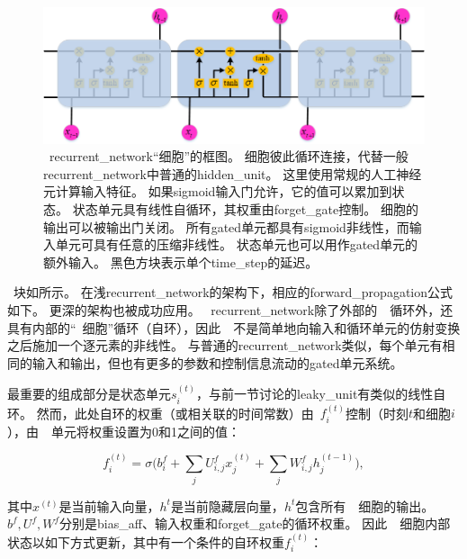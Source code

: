 \begin{figure}[!h]
	\centering
	\includegraphics[scale=0.7]{figures/chapter_2/fig_2_6.png}
	\caption{~\gls{recurrent_network}``细胞''的框图。
		细胞彼此循环连接，代替一般\gls{recurrent_network}中普通的\gls{hidden_unit}。
		这里使用常规的人工神经元计算输入特征。
		如果sigmoid输入门允许，它的值可以累加到状态。
		状态单元具有线性自循环，其权重由\gls{forget_gate}控制。
		细胞的输出可以被输出门关闭。
		所有\gls{gated}单元都具有sigmoid非线性，而输入单元可具有任意的压缩非线性。
		状态单元也可以用作\gls{gated}单元的额外输入。
		黑色方块表示单个\gls{time_step}的延迟。
	}\label{fig:chapter2_lstm_cell}
\end{figure}

~块如所示。
在浅\gls{recurrent_network}的架构下，相应的\gls{forward_propagation}公式如下。
更深的架构也被成功应用\citep{Graves-et-al-ICASSP2013,Pascanu-et-al-ICLR2014}。
~\gls{recurrent_network}除了外部的~~循环外，还具有内部的``~细胞''循环（自环），因此~~不是简单地向输入和循环单元的仿射变换之后施加一个逐元素的非线性。
与普通的\gls{recurrent_network}类似，每个单元有相同的输入和输出，但也有更多的参数和控制信息流动的\gls{gated}单元系统。

最重要的组成部分是状态单元$s_i^{(t)}$，与前一节讨论的\gls{leaky_unit}有类似的线性自环。
然而，此处自环的权重（或相关联的时间常数）由~$f_i^{(t)}$控制（时刻$t$和细胞$i$），由~~单元将权重设置为0和1之间的值：

\begin{equation}
f_i^{(t)} = \sigma \Big( b_i^f + \sum_j U_{i,j}^f x_j^{(t)} + \sum_j W_{i,j}^f h_j^{(t-1)} \Big),
\end{equation}

其中$x^{(t)}$是当前输入向量，$h^{t}$是当前隐藏层向量，$h^{t}$包含所有~~细胞的输出。 
$b^f, U^f, W^f$分别是\gls{bias_aff}、输入权重和\gls{forget_gate}的循环权重。
因此~~细胞内部状态以如下方式更新，其中有一个条件的自环权重$f_i^{(t)}$：

